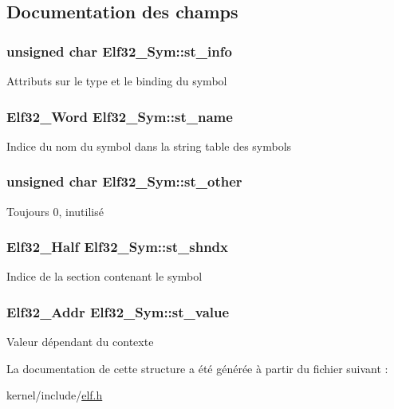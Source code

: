 \subsection{Documentation des champs}
\hypertarget{structElf32__Sym_a7d131c44ec48708b1c98f9b00ca9d528}{
\subsubsection[{st\+\_\+info}]{\setlength{\rightskip}{0pt plus 5cm}unsigned char Elf32\+\_\+\+Sym\+::st\+\_\+info}}\label{structElf32__Sym_a7d131c44ec48708b1c98f9b00ca9d528}
Attributs sur le type et le binding du symbol \hypertarget{structElf32__Sym_a6a972b30868879f8a1e071e0c45e5031}{
\subsubsection[{st\+\_\+name}]{\setlength{\rightskip}{0pt plus 5cm}Elf32\+\_\+\+Word Elf32\+\_\+\+Sym\+::st\+\_\+name}}\label{structElf32__Sym_a6a972b30868879f8a1e071e0c45e5031}
Indice du nom du symbol dans la string table des symbols \hypertarget{structElf32__Sym_a2e1bf6bedb5180f74ea8cbaf9cedfd36}{
\subsubsection[{st\+\_\+other}]{\setlength{\rightskip}{0pt plus 5cm}unsigned char Elf32\+\_\+\+Sym\+::st\+\_\+other}}\label{structElf32__Sym_a2e1bf6bedb5180f74ea8cbaf9cedfd36}
Toujours 0, inutilisé \hypertarget{structElf32__Sym_a46e54847ab00fbea62df8ee5dff8dec6}{
\subsubsection[{st\+\_\+shndx}]{\setlength{\rightskip}{0pt plus 5cm}Elf32\+\_\+\+Half Elf32\+\_\+\+Sym\+::st\+\_\+shndx}}\label{structElf32__Sym_a46e54847ab00fbea62df8ee5dff8dec6}
Indice de la section contenant le symbol \hypertarget{structElf32__Sym_abf8ff76884bc5e2acb5f7eb42f733c2e}{
\subsubsection[{st\+\_\+value}]{\setlength{\rightskip}{0pt plus 5cm}Elf32\+\_\+\+Addr Elf32\+\_\+\+Sym\+::st\+\_\+value}}\label{structElf32__Sym_abf8ff76884bc5e2acb5f7eb42f733c2e}
Valeur dépendant du contexte 

La documentation de cette structure a été générée à partir du fichier suivant \+:\begin{DoxyCompactItemize}
\item 
kernel/include/\hyperlink{elf_8h}{elf.\+h}\end{DoxyCompactItemize}
